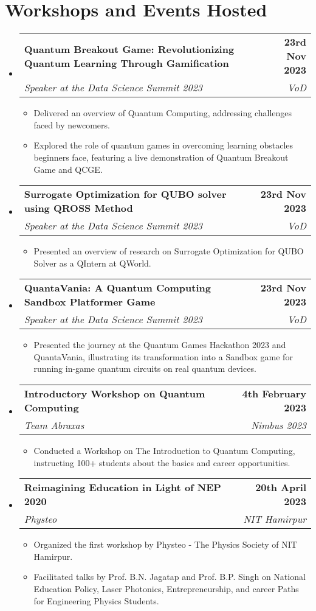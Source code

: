 \documentclass[letterpaper,11pt]{article}
\makeatletter
\newcommand{\resumeItem}[1]{
  \item\small{
    {#1 \vspace{-2pt}}
  }
}
\newcommand{\resumeSubheading}[4]{
  \vspace{-2pt}\item
    \begin{tabular*}{1.0\textwidth}[t]{l@{\extracolsep{\fill}}r}
      \textbf{#1} & \textbf{\small #2} \\
      \textit{\small#3} & \textit{\small #4} \\
    \end{tabular*}\vspace{-7pt}
}
\newcommand{\resumeSubHeadingListStart}{\begin{itemize}[leftmargin=0.0in, label={}]}
\newcommand{\resumeSubHeadingListEnd}{\end{itemize}}
\newcommand{\resumeItemListStart}{\begin{itemize}}
\newcommand{\resumeItemListEnd}{\end{itemize}\vspace{-5pt}}
\makeatother
\begin{document}

\section{Workshops and Events Hosted}
    \resumeSubHeadingListStart
        \resumeSubheading{Quantum Breakout Game: Revolutionizing Quantum Learning Through Gamification}{23rd Nov 2023}{Speaker at the Data Science Summit 2023}{VoD}
            \resumeItemListStart
                \resumeItem{Delivered an overview of Quantum Computing, addressing challenges faced by newcomers.}
                \resumeItem{Explored the role of quantum games in overcoming learning obstacles beginners face, featuring a live demonstration of Quantum Breakout Game and QCGE.}
            \resumeItemListEnd 

        \resumeSubheading{Surrogate Optimization for QUBO solver using QROSS Method}{23rd Nov 2023}{Speaker at the Data Science Summit 2023}{VoD}
            \resumeItemListStart
                \resumeItem{Presented an overview of research on Surrogate Optimization for QUBO Solver as a QIntern at QWorld.}
            \resumeItemListEnd 

        \resumeSubheading{QuantaVania: A Quantum Computing Sandbox Platformer Game}{23rd Nov 2023}{Speaker at the Data Science Summit 2023}{VoD}
            \resumeItemListStart
                \resumeItem{Presented the journey at the Quantum Games Hackathon 2023 and QuantaVania, illustrating its transformation into a Sandbox game for running in-game quantum circuits on real quantum devices.}
            \resumeItemListEnd 
        
        \resumeSubheading{Introductory Workshop on Quantum Computing}{4th February 2023}{Team Abraxas}{Nimbus 2023}
            \resumeItemListStart
                \resumeItem{Conducted a Workshop on The Introduction to Quantum Computing, instructing 100+ students about the basics and career opportunities.}
            \resumeItemListEnd 

        \resumeSubheading{Reimagining Education in Light of NEP 2020}{20th April 2023}{Physteo}{NIT Hamirpur}
            \resumeItemListStart
                \resumeItem{Organized the first workshop by Physteo - The Physics Society of NIT Hamirpur.}
                \resumeItem{Facilitated talks by Prof. B.N. Jagatap and Prof. B.P. Singh on National Education Policy, Laser Photonics, Entrepreneurship, and career Paths for Engineering Physics Students.}
            \resumeItemListEnd 
    \resumeSubHeadingListEnd
\end{document}
